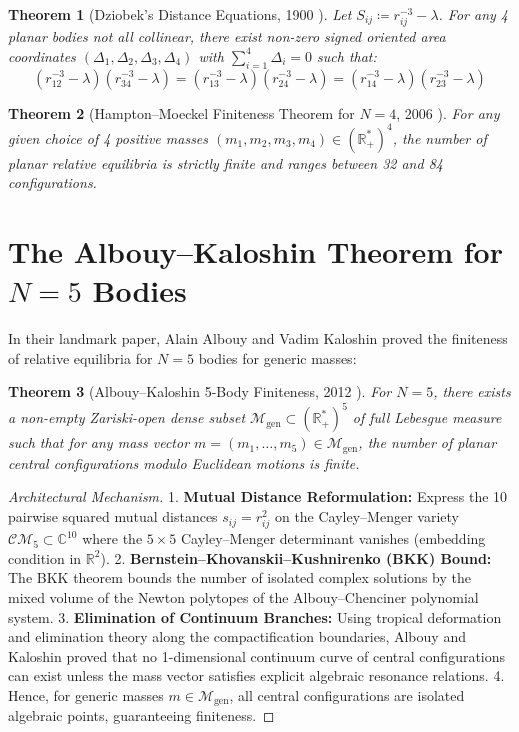 \documentclass[11pt,a4paper]{article}
\newtheorem{theorem}{Theorem}[section]
\theoremstyle{definition}
\begin{document}
\begin{theorem}[Dziobek's Distance Equations, 1900 \cite{dziobek1900}]\label{thm:dziobek}
Let $S_{ij} \coloneqq r_{ij}^{-3} - \lambda$. For any 4 planar bodies not all collinear, there exist non-zero signed oriented area coordinates $(\Delta_1, \Delta_2, \Delta_3, \Delta_4)$ with $\sum_{i=1}^4 \Delta_i = 0$ such that:
\begin{equation}\label{eq:dziobek_relations}
(r_{12}^{-3} - \lambda)(r_{34}^{-3} - \lambda) = (r_{13}^{-3} - \lambda)(r_{24}^{-3} - \lambda) = (r_{14}^{-3} - \lambda)(r_{23}^{-3} - \lambda)
\end{equation}
\end{theorem}

\begin{theorem}[Hampton--Moeckel Finiteness Theorem for $N=4$, 2006 \cite{hampton2006}]\label{thm:hampton_moeckel}
For any given choice of 4 positive masses $(m_1, m_2, m_3, m_4) \in (\mathbb{R}_+^*)^4$, the number of planar relative equilibria is strictly finite and ranges between 32 and 84 configurations.
\end{theorem}

\section{The Albouy--Kaloshin Theorem for $N=5$ Bodies}

In their landmark paper, Alain Albouy and Vadim Kaloshin \cite{albouy2012} proved the finiteness of relative equilibria for $N=5$ bodies for generic masses:

\begin{theorem}[Albouy--Kaloshin 5-Body Finiteness, 2012 \cite{albouy2012}]\label{thm:albouy_kaloshin}
For $N=5$, there exists a non-empty Zariski-open dense subset $\mathcal{M}_{\text{gen}} \subset (\mathbb{R}_+^*)^5$ of full Lebesgue measure such that for any mass vector $m = (m_1, \dots, m_5) \in \mathcal{M}_{\text{gen}}$, the number of planar central configurations modulo Euclidean motions is finite.
\end{theorem}

\begin{proof}[Architectural Mechanism]
1. \textbf{Mutual Distance Reformulation:} Express the 10 pairwise squared mutual distances $s_{ij} = r_{ij}^2$ on the Cayley--Menger variety $\mathcal{CM}_5 \subset \mathbb{C}^{10}$ where the $5 \times 5$ Cayley--Menger determinant vanishes (embedding condition in $\mathbb{R}^2$).
2. \textbf{Bernstein--Khovanskii--Kushnirenko (BKK) Bound:} The BKK theorem bounds the number of isolated complex solutions by the mixed volume of the Newton polytopes of the Albouy--Chenciner polynomial system.
3. \textbf{Elimination of Continuum Branches:} Using tropical deformation and elimination theory along the compactification boundaries, Albouy and Kaloshin proved that no 1-dimensional continuum curve of central configurations can exist unless the mass vector satisfies explicit algebraic resonance relations.
4. Hence, for generic masses $m \in \mathcal{M}_{\text{gen}}$, all central configurations are isolated algebraic points, guaranteeing finiteness.
\end{proof}
\end{document}
